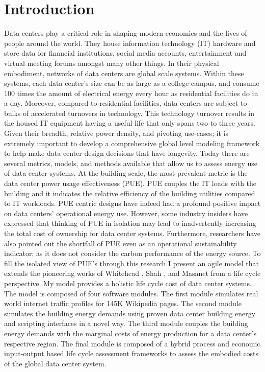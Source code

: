 \section{Introduction}

Data centers play a critical role in shaping modern economies and the lives of people around the world. They house information technology (IT) hardware and store data for financial institutions, social media accounts, entertainment and virtual meeting forums amongst many other things. In their physical embodiment, networks of data centers are global scale systems. Within these systems, each data center’s size can be as large as a college campus, and consume 100 times the amount of electrical energy every hour as residential facilities do in a day. Moreover, compared to residential facilities, data centers are subject to bulks of accelerated turnovers in technology. This technology turnover results in the housed IT equipment having a useful life that only spans two to three years. Given their breadth, relative power density, and pivoting use-cases; it is extremely important to develop a comprehensive global level modeling framework to help make data center design decisions that have longevity.
Today there are several metrics, models, and methods available that allow us to assess energy use of data center systems. At the building scale, the most prevalent metric is the data center power usage effectiveness (PUE). PUE couples the IT loads with the building and it indicates the relative efficiency of the building utilities compared to IT workloads. PUE centric designs have indeed had a profound positive impact on data centers' operational energy use. However, some industry insiders have expressed that thinking of PUE in isolation may lead to inadvertently increasing the total cost of ownership for data center systems. Furthermore, researchers have also pointed out the shortfall of PUE even as an operational sustainability indicator; as it does not consider the carbon performance of the energy source.
To fill the isolated view of PUE’s through this research I present an agile model that extends the pioneering works of Whitehead \cite{whitehead15}, Shah \cite{shah11}, and Masanet \cite{CLEER13} from a life cycle perspective. My model provides a holistic life cycle cost of data center systems. The model is composed of four software modules. The first module simulates real world internet traffic profiles for 145K Wikipedia pages. The second module simulates the building energy demands using proven data center building energy and scripting interfaces in a novel way. The third module couples the building energy demands with the marginal costs of energy production for a data center’s respective region. The final module is composed of a hybrid process and economic input-output based life cycle assessment frameworks to assess the embodied costs of the global data center system.
